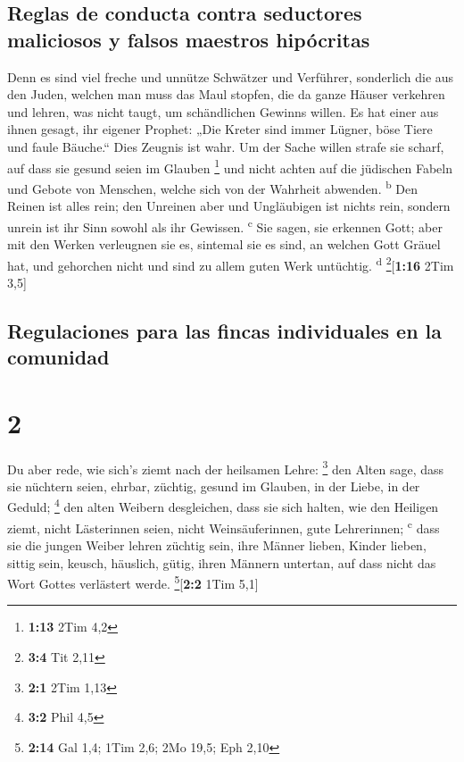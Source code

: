 \hypertarget{reglas-de-conducta-contra-seductores-maliciosos-y-falsos-maestros-hipuxf3critas}{%
\subsection{Reglas de conducta contra seductores maliciosos y falsos
maestros
hipócritas}\label{reglas-de-conducta-contra-seductores-maliciosos-y-falsos-maestros-hipuxf3critas}}

 Denn es sind viel freche und unnütze Schwätzer und
Verführer, sonderlich die aus den Juden,  welchen man
muss das Maul stopfen, die da ganze Häuser verkehren und lehren, was
nicht taugt, um schändlichen Gewinns willen.  Es hat
einer aus ihnen gesagt, ihr eigener Prophet: „Die Kreter sind immer
Lügner, böse Tiere und faule Bäuche.``  Dies Zeugnis ist
wahr. Um der Sache willen strafe sie scharf, auf dass sie gesund seien
im Glauben \footnote{\textbf{1:13} 2Tim 4,2}  und nicht
achten auf die jüdischen Fabeln und Gebote von Menschen, welche sich von
der Wahrheit abwenden. \textsuperscript{b}  Den Reinen
ist alles rein; den Unreinen aber und Ungläubigen ist nichts rein,
sondern unrein ist ihr Sinn sowohl als ihr Gewissen. \textsuperscript{c}
 Sie sagen, sie erkennen Gott; aber mit den Werken
verleugnen sie es, sintemal sie es sind, an welchen Gott Gräuel hat, und
gehorchen nicht und sind zu allem guten Werk untüchtig.
\textsuperscript{d} \footnote{\textbf{3:4} Tit 2,11}{[}\textbf{1:16}
2Tim 3,5{]}

\hypertarget{regulaciones-para-las-fincas-individuales-en-la-comunidad}{%
\subsection{Regulaciones para las fincas individuales en la
comunidad}\label{regulaciones-para-las-fincas-individuales-en-la-comunidad}}

\hypertarget{section-1}{%
\section{2}\label{section-1}}

 Du aber rede, wie sich's ziemt nach der heilsamen Lehre:
\footnote{\textbf{2:1} 2Tim 1,13}  den Alten sage, dass
sie nüchtern seien, ehrbar, züchtig, gesund im Glauben, in der Liebe, in
der Geduld; \footnote{\textbf{3:2} Phil 4,5}  den alten
Weibern desgleichen, dass sie sich halten, wie den Heiligen ziemt, nicht
Lästerinnen seien, nicht Weinsäuferinnen, gute Lehrerinnen;
\textsuperscript{c}  dass sie die jungen Weiber lehren
züchtig sein, ihre Männer lieben, Kinder lieben,  sittig
sein, keusch, häuslich, gütig, ihren Männern untertan, auf dass nicht
das Wort Gottes verlästert werde. \footnote{\textbf{2:14} Gal 1,4; 1Tim
  2,6; 2Mo 19,5; Eph 2,10}{[}\textbf{2:2} 1Tim 5,1{]}

